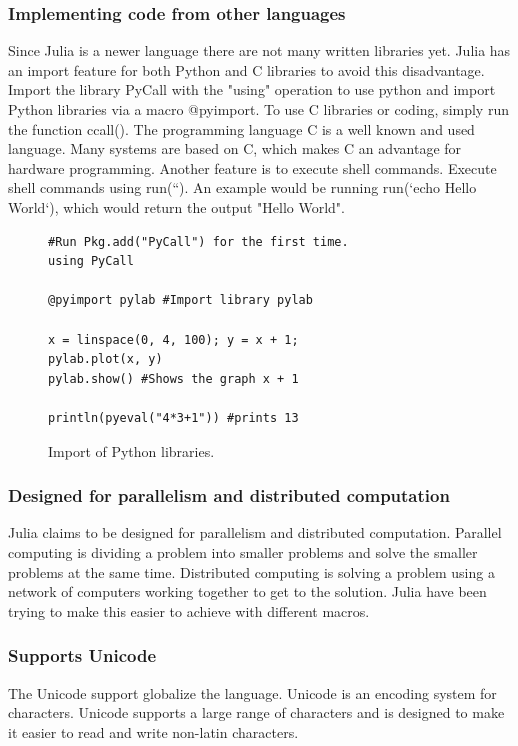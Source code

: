 \documentclass[a4paper, 11pt, titlepage]{article}
\begin{document}
\subsubsection{Implementing code from other languages}
Since Julia is a newer language there are not many written libraries yet. Julia has an import feature for both Python and C libraries to avoid this disadvantage. Import the library PyCall with the "using" operation to use python and import Python libraries via a macro @pyimport. To use C libraries or coding, simply run the function ccall(). The programming language C is a well known and used language. Many systems are based on C, which makes C an advantage for hardware programming. Another feature is to execute shell commands. Execute shell commands using run(``). An example would be running run(`echo Hello World`), which would return the output "Hello World".

\begin{figure}[H]
		\centering
		\begin{lstlisting}
#Run Pkg.add("PyCall") for the first time.
using PyCall

@pyimport pylab #Import library pylab

x = linspace(0, 4, 100); y = x + 1;
pylab.plot(x, y)
pylab.show() #Shows the graph x + 1

println(pyeval("4*3+1")) #prints 13
		\end{lstlisting}
		\caption{Import of Python libraries.}
\end{figure}

\subsubsection{Designed for parallelism and distributed computation}
Julia claims to be designed for parallelism and distributed computation. Parallel computing is dividing a problem into smaller problems and solve the smaller problems at the same time. Distributed computing is solving a problem using a network of computers working together to get to the solution. Julia have been trying to make this easier to achieve with different macros.

\subsubsection{Supports Unicode}
The Unicode support globalize the language. Unicode is an encoding system for characters. Unicode supports a large range of characters and is designed to make it easier to read and write non-latin characters.
\end{document}
